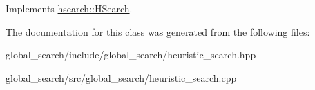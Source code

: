 Implements \hyperlink{classhsearch_1_1HSearch_a5d325955c4faedaca0c68155fd1f7e69}{hsearch\+::\+H\+Search}.



The documentation for this class was generated from the following files\+:\begin{DoxyCompactItemize}
\item 
global\+\_\+search/include/global\+\_\+search/heuristic\+\_\+search.\+hpp\item 
global\+\_\+search/src/global\+\_\+search/heuristic\+\_\+search.\+cpp\end{DoxyCompactItemize}
